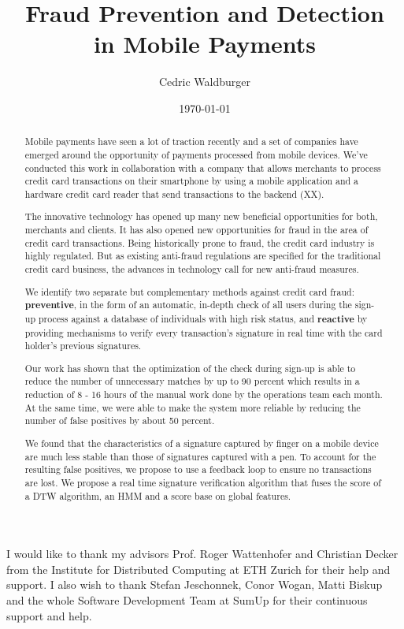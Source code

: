 \documentclass[a4paper, oneside]{csthesis}
\title{Fraud Prevention and Detection\\[5pt] in Mobile Payments}
\author{Cedric Waldburger}
\institute{Distributed Computing Group \\[2pt]
Computer Engineering and Networks Laboratory \\[2pt]
ETH Zurich}
\date{\today}
\begin{document}
\frontmatter
\maketitle %

\cleardoublepage

\begin{acknowledgements}

  I would like to thank my advisors Prof. Roger Wattenhofer and Christian Decker from the Institute for Distributed Computing at ETH Zurich for their help and support. I also wish to thank Stefan Jeschonnek, Conor Wogan, Matti Biskup and the whole Software Development Team at SumUp for their continuous support and help.

\end{acknowledgements}


\begin{abstract}
    Mobile payments have seen a lot of traction recently and a set of companies have emerged around the opportunity of payments processed from mobile devices. We've conducted this work in collaboration with a company that allows merchants to process credit card transactions on their smartphone by using a mobile application and a hardware credit card reader that send transactions to the backend (XX).

    The innovative technology has opened up many new beneficial opportunities for both, merchants and clients. It has also opened new opportunities for fraud in the area of credit card transactions. Being historically prone to fraud, the credit card industry is highly regulated. But as existing anti-fraud regulations are specified for the traditional credit card business, the advances in technology call for new anti-fraud measures.

    We identify two  separate but complementary methods against credit card fraud: \textbf{preventive}, in the form of an automatic, in-depth check of all users during the sign-up process against a database of individuals with high risk status, and \textbf{reactive} by providing mechanisms to verify every transaction's signature in real time with the card holder's previous signatures.

    Our work has shown that the optimization of the check during sign-up is able to reduce the number of unnecessary matches by up to 90 percent which results in a reduction of 8 - 16 hours of the manual work done by the operations team each month. At the same time, we were able to make the system more reliable by reducing the number of false positives by about 50 percent.

    We found that the characteristics of a signature captured by finger on a mobile device are much less stable than those of signatures captured with a pen. To account for the resulting false positives, we propose to use a feedback loop to ensure no transactions are lost. We propose a real time signature verification algorithm that fuses the score of a DTW algorithm, an HMM and a score base on global features.

\end{abstract}
\end{document}
